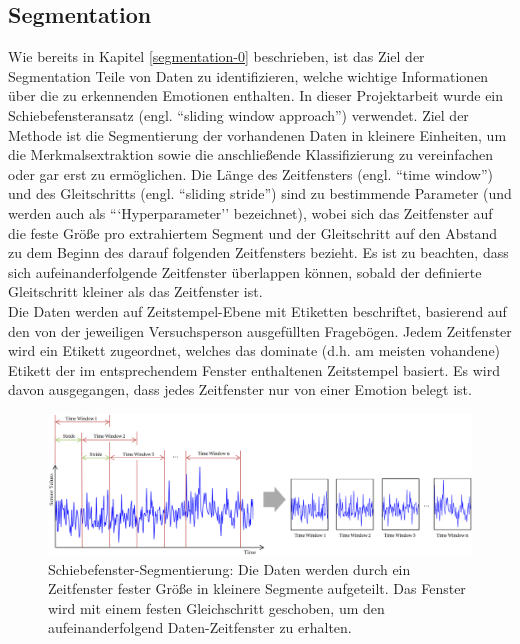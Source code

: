 \subsection{Segmentation} \label{segmenation-1}

Wie bereits in Kapitel \ref{segmentation-0} beschrieben, ist das Ziel der Segmentation Teile von Daten zu identifizieren, welche wichtige Informationen über die zu erkennenden Emotionen enthalten.
In dieser Projektarbeit wurde ein Schiebefensteransatz (engl. ``sliding window approach'') verwendet. 
Ziel der Methode ist die Segmentierung der vorhandenen Daten in kleinere Einheiten, um die Merkmalsextraktion sowie die anschließende Klassifizierung zu vereinfachen oder gar erst zu ermöglichen.
Die Länge des Zeitfensters (engl. ``time window'') und des Gleitschritts (engl. ``sliding stride'') sind zu bestimmende Parameter (und werden auch als ```Hyperparameter'' bezeichnet), wobei sich das Zeitfenster auf die feste Größe pro extrahiertem Segment und der Gleitschritt auf den Abstand zu dem Beginn des darauf folgenden Zeitfensters bezieht.
Es ist zu beachten, dass sich aufeinanderfolgende Zeitfenster überlappen können, sobald der definierte Gleitschritt kleiner als das Zeitfenster ist. \\


Die Daten werden auf Zeitstempel-Ebene mit Etiketten beschriftet, basierend auf den von der jeweiligen Versuchsperson ausgefüllten Fragebögen. 
Jedem Zeitfenster wird ein Etikett zugeordnet, welches das dominate (d.h. am meisten vohandene) Etikett der im entsprechendem Fenster enthaltenen Zeitstempel basiert. Es wird davon ausgegangen, dass jedes Zeitfenster nur von einer Emotion belegt ist. \\


\begin{figure}[h]
\includegraphics[width=\textwidth]{Images/segmentation.png} 
\caption[Schiebefenster-Segmentierung]{Schiebefenster-Segmentierung: Die Daten werden durch ein Zeitfenster fester Größe in kleinere Segmente aufgeteilt. Das Fenster wird mit einem festen Gleichschritt geschoben, um den aufeinanderfolgend Daten-Zeitfenster zu erhalten. }
\end{figure} 